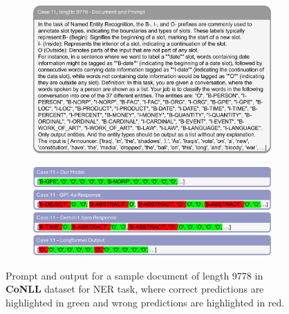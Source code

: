 \documentclass[11pt]{article}
\begin{document}
\begin{figure}[!h]
    \centering
    \begin{subfigure}[b]{1.0\linewidth}   
        \includegraphics[width=\textwidth]{images/case11_prompt.png} 
    \end{subfigure}
    \vspace{1pt}
    \begin{subfigure}[b]{1.0\linewidth}  
        \includegraphics[width=\textwidth]{images/case11_ans.png}
    \end{subfigure}
    \caption{Prompt and output for a sample document of length 9778 in \textbf{CoNLL} dataset for NER task, where correct predictions are highlighted in green and wrong predictions are highlighted in red.}
    \label{case11}
\end{figure}
\end{document}
